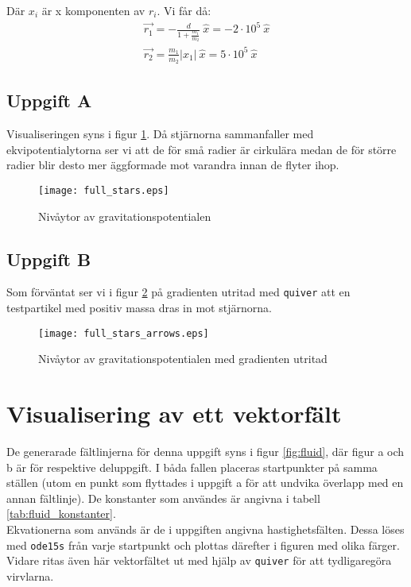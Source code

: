 \documentclass[12pt,a4paper]{article}
\begin{document}
Där $x_i$ är x komponenten av $r_i$. Vi får då:
\begin{equation}
\begin{array}{lcl}
\vec{r_1} = - \frac{d}{1 + \frac{m_1}{m_2}} \ \hat{x} = -2\cdot10^{5} \ \hat{x} \\
\vec{r_2} = \frac{m_1}{m_2} |x_1| \ \hat{x} = 5\cdot10^{5} \ \hat{x}
\end{array}
\end{equation}

\subsection{Uppgift A}
Visualiseringen syns i figur \ref{fig:stars}. Då stjärnorna sammanfaller med ekvipotentialytorna ser vi att de för små radier är cirkulära medan de för större radier blir desto mer äggformade mot varandra innan de flyter ihop.
\begin{figure}[!ht]
\centering
\texttt{[image: full\_stars.eps]}
\caption{\label{fig:stars} Nivåytor av gravitationspotentialen}
\end{figure}

\subsection{Uppgift B}
Som förväntat ser vi i figur \ref{fig:stars_grad} på gradienten utritad med \texttt{quiver} att en testpartikel med positiv massa dras in mot stjärnorna.
\begin{figure}[!ht]
\centering
\texttt{[image: full\_stars\_arrows.eps]}
\caption{\label{fig:stars_grad} Nivåytor av gravitationspotentialen med gradienten utritad}
\end{figure}


\section{Visualisering av ett vektorfält}
De generarade fältlinjerna för denna uppgift syns i figur \ref{fig:fluid}, där figur a och b är för respektive deluppgift. I båda fallen placeras startpunkter på samma ställen (utom en punkt som flyttades i uppgift a för att undvika överlapp med en annan fältlinje). De konstanter som användes är angivna i tabell \ref{tab:fluid_konstanter}.\\



Ekvationerna som används är de i uppgiften angivna hastighetsfälten. Dessa löses med \texttt{ode15s} från varje startpunkt och plottas därefter i figuren med olika färger. Vidare ritas även här vektorfältet ut med hjälp av \texttt{quiver} för att tydligaregöra virvlarna.
\end{document}
